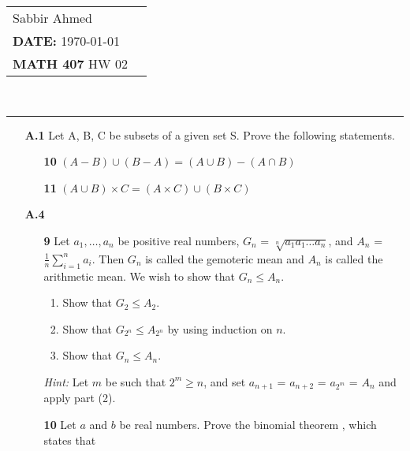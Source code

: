 \documentclass[paper=usletter, fontsize=12pt]{article}
\newcommand{\documentinfo}[5]{
    \begin{centering}
        \parbox{2in}{
        \begin{spacing}{1}
            \begin{flushleft}
                \begin{tabular}{l l}
                    #1 \\
                    #2 \\
                    #3 \\
                \end{tabular}\\
                \rule{\textwidth}{1pt}
            \end{flushleft}
        \end{spacing}
        }
    \end{centering}
}
\begin{document}
    \documentinfo{Sabbir Ahmed}{\textbf{DATE:} \today}{\textbf{MATH 407} HW 02}
    \vspace{-0.10in}

    \begin{itemize}

        \item[\textbf{A.1}] Let A, B, C be subsets of a given set S. Prove the
        following statements.

            \begin{itemize}

                \item[\textbf{10}] $(A - B) \cup (B - A) = (A \cup B) - (A \cap
                B)$

                \item[\textbf{11}] $(A \cup B) \times C = (A \times C) \cup (B
                \times C)$

            \end{itemize}

        \item[\textbf{A.4}]

        \begin{itemize}

            \item[\textbf{9}] Let $a_1, \ldots, a_n$ be positive real numbers,
            $G_n$ = $\sqrt[n]{a_{1}a_{1}\ldots a_{n}}$, and $A_n$ =
            $\frac{1}{n}\sum_{i=1}^{n}a_i$. Then $G_n$ is called the gemoteric
            mean and $A_n$ is called the arithmetic mean. We wish to show that
            $G_n \le A_n$.

            \begin{enumerate}

                \item Show that $G_2 \le A_2$.

                \item Show that $G_{2^n} \le A_{2^n}$ by using induction on
                $n$.

                \item Show that $G_n \le A_n$.

            \end{enumerate}

            \textit{Hint:} Let $m$ be such that $2^m \ge n$, and set $a_{n+1}$
            = $a_{n+2}$ = $a_{2^m}$ = $A_n$ and apply part (2).

            \item[\textbf{10}] Let $a$ and $b$ be real numbers. Prove the
            binomial theorem , which states that


\end{itemize}
\end{itemize}
\end{document}
